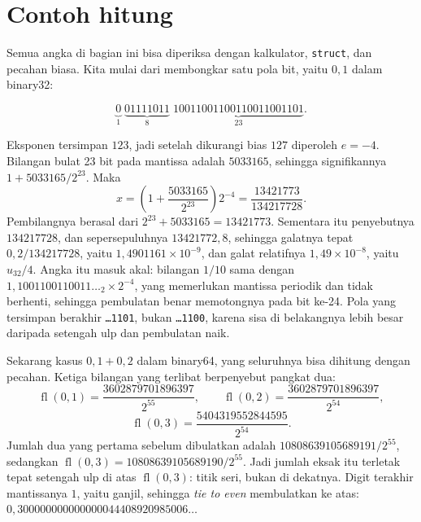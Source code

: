 \section{Contoh hitung}

Semua angka di bagian ini bisa diperiksa dengan kalkulator, \texttt{struct}, dan
pecahan biasa. Kita mulai dari membongkar satu pola bit, yaitu $0{,}1$ dalam binary32:

\[
  \underbrace{0}_{1}\;\underbrace{01111011}_{8}\;
  \underbrace{10011001100110011001101}_{23}.
\]

Eksponen tersimpan $123$, jadi setelah dikurangi bias $127$ diperoleh $e=-4$. Bilangan
bulat 23 bit pada mantissa adalah $5033165$, sehingga signifikannya
$1+5033165/2^{23}$. Maka
\[
  x=\left(1+\frac{5033165}{2^{23}}\right)2^{-4}=\frac{13421773}{134217728}.
\]
Pembilangnya berasal dari $2^{23}+5033165=13421773$. Sementara itu penyebutnya
$134217728$, dan sepersepuluhnya $13421772{,}8$, sehingga galatnya tepat
$0{,}2/134217728$, yaitu $1{,}4901161\times10^{-9}$,
dan galat relatifnya $1{,}49\times10^{-8}$, yaitu $u_{32}/4$. Angka itu masuk akal:
bilangan $1/10$ sama dengan $1{,}1001100110011\dots_{2}\times2^{-4}$, yang memerlukan
mantissa periodik dan tidak berhenti, sehingga pembulatan benar memotongnya pada bit
ke-24. Pola yang tersimpan
berakhir \texttt{\dots 1101}, bukan \texttt{\dots 1100}, karena sisa di belakangnya
lebih besar daripada setengah ulp dan pembulatan naik.


Sekarang kasus $0{,}1+0{,}2$ dalam binary64, yang seluruhnya bisa dihitung dengan
pecahan. Ketiga bilangan yang terlibat berpenyebut pangkat dua:
\[
  \operatorname{fl}(0{,}1)=\frac{3602879701896397}{2^{55}},\qquad
  \operatorname{fl}(0{,}2)=\frac{3602879701896397}{2^{54}},
\]
\[
  \operatorname{fl}(0{,}3)=\frac{5404319552844595}{2^{54}}.
\]
Jumlah dua yang pertama sebelum dibulatkan adalah $10808639105689191/2^{55}$,
sedangkan $\operatorname{fl}(0{,}3)=10808639105689190/2^{55}$. Jadi jumlah eksak itu
terletak tepat setengah ulp di atas $\operatorname{fl}(0{,}3)$: titik seri, bukan di
dekatnya. Digit terakhir mantissanya $1$, yaitu ganjil, sehingga \emph{tie to even}
membulatkan ke atas: $0{,}300000000000000044408920985006\dots$

